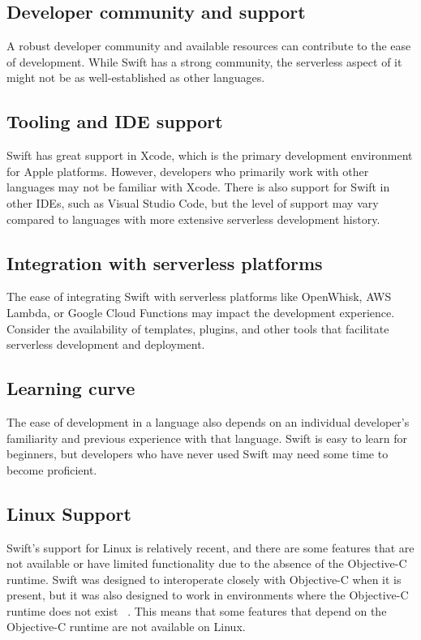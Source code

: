 \subsection{Developer community and support}

A robust developer community and available resources can contribute to the ease of development. While Swift has a strong community, the serverless aspect of it might not be as well-established as other languages.

\subsection{Tooling and IDE support}

Swift has great support in Xcode, which is the primary development environment for Apple platforms. However, developers who primarily work with other languages may not be familiar with Xcode. There is also support for Swift in other IDEs, such as Visual Studio Code, but the level of support may vary compared to languages with more extensive serverless development history.

\subsection{Integration with serverless platforms}

The ease of integrating Swift with serverless platforms like OpenWhisk, AWS Lambda, or Google Cloud Functions may impact the development experience. Consider the availability of templates, plugins, and other tools that facilitate serverless development and deployment.

\subsection{Learning curve}

The ease of development in a language also depends on an individual developer's familiarity and previous experience with that language. Swift is easy to learn for beginners, but developers who have never used Swift may need some time to become proficient.
    
\subsection{Linux Support}

Swift's support for Linux is relatively recent, and there are some features that are not available or have limited functionality due to the absence of the Objective-C runtime. Swift was designed to interoperate closely with Objective-C when it is present, but it was also designed to work in environments where the Objective-C runtime does not exist~\cite{swift-platform-support}
. This means that some features that depend on the Objective-C runtime are not available on Linux.

